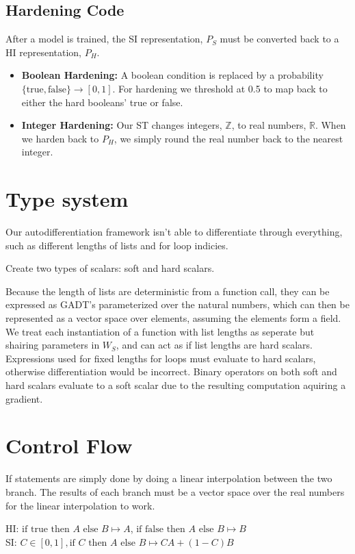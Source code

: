 \documentclass{article}
\begin{document}
\subsection{Hardening Code}
After a model is trained, the SI representation, $P_S$ must be converted back to a HI representation, $P_H$.
\begin{itemize}
    \item \textbf{Boolean Hardening:} A boolean condition is replaced by a probability $\{\text{true}, \text{false} \} \longrightarrow [0, 1]$. For hardening we threshold at 0.5 to map back to either the hard booleans' true or false.
    \item \textbf{Integer Hardening:} Our ST changes integers, $\mathbb{Z}$, to real numbers, $\mathbb{R}$. When we harden back to $P_H$, we simply round the real number back to the nearest integer.
\end{itemize}

\section*{Type system}
Our autodifferentiation framework isn't able to differentiate through everything, such as different lengths of lists and for loop indicies.

Create two types of scalars: soft and hard scalars.

Because the length of lists are deterministic from a function call, they can be expressed as GADT's parameterized over the natural numbers, which can then be represented as a vector space over elements, assuming the elements form a field. We treat each instantiation of a function with list lengths as seperate but shairing parameters in $W_S$, and can act as if list lengths are hard scalars. Expressions used for fixed lengths for loops must evaluate to hard scalars, otherwise differentiation would be incorrect. Binary operators on both soft and hard scalars evaluate to a soft scalar due to the resulting computation aquiring a gradient.
\section{Control Flow}
If statements are simply done by doing a linear interpolation between the two branch. The results of each branch must be a vector space over the real numbers for the linear interpolation to work.

\begin{center}
  HI: $\text{if } \text{true} \text{ then } A \text{ else } B \mapsto A$, $\text{if } \text{false} \text{ then } A \text{ else } B \mapsto B$\\
  SI: $C \in [0, 1], \text{if } C \text{ then } A \text{ else } B \mapsto CA + (1-C)B$
\end{center}
\end{document}
